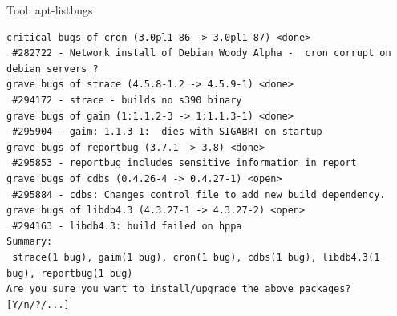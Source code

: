 \documentclass[cjk,dvipdfm,12pt]{beamer}
\begin{document}
\begin{frame}[containsverbatim]{Tool: apt-listbugs}
\begin{verbatim}
critical bugs of cron (3.0pl1-86 -> 3.0pl1-87) <done>
 #282722 - Network install of Debian Woody Alpha -  cron corrupt on debian servers ?
grave bugs of strace (4.5.8-1.2 -> 4.5.9-1) <done>
 #294172 - strace - builds no s390 binary
grave bugs of gaim (1:1.1.2-3 -> 1:1.1.3-1) <done>
 #295904 - gaim: 1.1.3-1:  dies with SIGABRT on startup
grave bugs of reportbug (3.7.1 -> 3.8) <done>
 #295853 - reportbug includes sensitive information in report
grave bugs of cdbs (0.4.26-4 -> 0.4.27-1) <open>
 #295884 - cdbs: Changes control file to add new build dependency.
grave bugs of libdb4.3 (4.3.27-1 -> 4.3.27-2) <open>
 #294163 - libdb4.3: build failed on hppa
Summary:
 strace(1 bug), gaim(1 bug), cron(1 bug), cdbs(1 bug), libdb4.3(1 bug), reportbug(1 bug)
Are you sure you want to install/upgrade the above packages? [Y/n/?/...]
\end{verbatim}
\end{frame}
\end{document}
